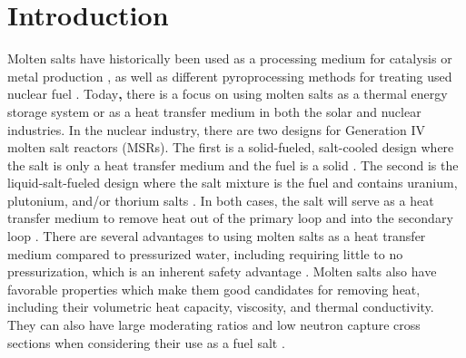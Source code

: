 \documentclass[review]{elsarticle}
\providecommand{\DIFaddtex}[1]{{\bf #1}} %
\providecommand{\DIFaddbegin}{\protect\color{blue}} %
\providecommand{\DIFaddend}{\protect\color{black}} %
\providecommand{\DIFadd}[1]{\texorpdfstring{\DIFaddtex{#1}}{#1}} %
\newcommand{\DIFaddincludegraphics}[2][]{{\color{blue}\fbox{\DIFOincludegraphics[#1]{#2}}}} %
\DeclareRobustCommand{\DIFaddbegin}{\DIFOaddbegin \let\includegraphics\DIFaddincludegraphics} %
\DeclareRobustCommand{\DIFaddend}{\DIFOaddend \let\includegraphics\DIFOincludegraphics} %
\begin{document}

\section{Introduction}
Molten salts have historically been used as a processing medium for catalysis \cite{JIN20202382, HU20204244} or metal production \cite{Zhu2014, VAHIDI2018178}, as well as different pyroprocessing methods for treating used nuclear fuel \cite{CHOI2015572, osti_22107867}. Today\DIFaddbegin \DIFadd{, }\DIFaddend there is a focus on using molten salts as a thermal energy storage system or as a heat transfer medium in both the solar and nuclear industries. In the nuclear industry, there are two designs for Generation IV molten salt reactors (MSRs). The first is a solid-fueled, salt-cooled design where the salt is only a heat transfer medium and the fuel is a solid \cite{doi:10.13182/NSE90-374}. The second is the liquid-salt-fueled design where the salt mixture is the fuel and contains uranium, plutonium, and/or thorium salts \cite{doi:10.1080/00295450.2019.1586372}. In both cases, the salt will serve as a heat transfer medium to remove heat out of the primary loop and into the secondary loop \cite{gakhar2021molten}. There are several advantages to using molten salts as a heat transfer medium compared to pressurized water, including requiring little to no pressurization, which is an inherent safety advantage \cite{leblanc2017integral}. Molten salts also have favorable properties which make them good candidates for removing heat, including their volumetric heat capacity, viscosity, and thermal conductivity. They can also have large moderating ratios and low neutron capture cross sections when considering their use as a fuel salt \cite{williams2006assessment}.
\end{document}
